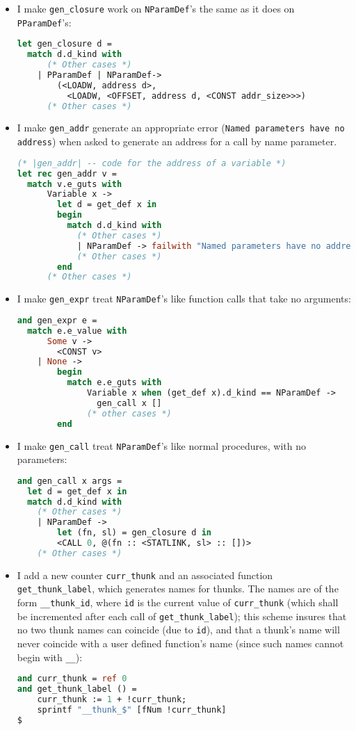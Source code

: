 \documentclass[a4paper,10pt]{article}
\begin{document}
\begin{itemize}
    \item I make \texttt{gen\_closure} work on \texttt{NParamDef}'s the same as it does on \texttt{PParamDef}'s:
        \begin{lstlisting}[language=ml]
let gen_closure d = 
  match d.d_kind with
      (* Other cases *)
    | PParamDef | NParamDef->
        (<LOADW, address d>,
          <LOADW, <OFFSET, address d, <CONST addr_size>>>)
      (* Other cases *)
        \end{lstlisting}
    \item I make \texttt{gen\_addr} generate an appropriate error (\texttt{Named parameters have no address}) when asked to generate an address for a call by name parameter.
        \begin{lstlisting}[language=ml]
(* |gen_addr| -- code for the address of a variable *)
let rec gen_addr v = 
  match v.e_guts with
      Variable x ->
        let d = get_def x in
        begin
          match d.d_kind with
            (* Other cases *)
            | NParamDef -> failwith "Named parameters have no address"
            (* Other cases *)
        end
      (* Other cases *)
        \end{lstlisting}
    \item I make \texttt{gen\_expr} treat \texttt{NParamDef}'s like function calls that take no arguments:
\begin{lstlisting}[language=ml]
and gen_expr e =
  match e.e_value with
      Some v -> 
        <CONST v>
    | None -> 
        begin
          match e.e_guts with
              Variable x when (get_def x).d_kind == NParamDef ->
                gen_call x []
              (* other cases *)
        end
\end{lstlisting}
    \item I make \texttt{gen\_call} treat \texttt{NParamDef}'s like normal procedures, with no parameters:
\begin{lstlisting}[language=ml]
and gen_call x args =
  let d = get_def x in
  match d.d_kind with
    (* Other cases *)
    | NParamDef ->
        let (fn, sl) = gen_closure d in
        <CALL 0, @(fn :: <STATLINK, sl> :: [])>
    (* Other cases *)
\end{lstlisting}
    \item I add a new counter \texttt{curr\_thunk} and an associated function \texttt{get\_thunk\_label}, which generates names for thunks. The names are of the form \texttt{\_\_thunk\_id}, where \texttt{id} is the current value of \texttt{curr\_thunk} (which shall be incremented after each call of \texttt{get\_thunk\_label}); this scheme insures that no two thunk names can coincide (due to \texttt{id}), and that a thunk's name will never coincide with a user defined function's name (since such names cannot begin with \texttt{\_\_}):
\begin{lstlisting}[language=ml]
and curr_thunk = ref 0
and get_thunk_label () = 
    curr_thunk := 1 + !curr_thunk;
    sprintf "__thunk_$" [fNum !curr_thunk]
$
\end{lstlisting}


\end{itemize}
\end{document}
